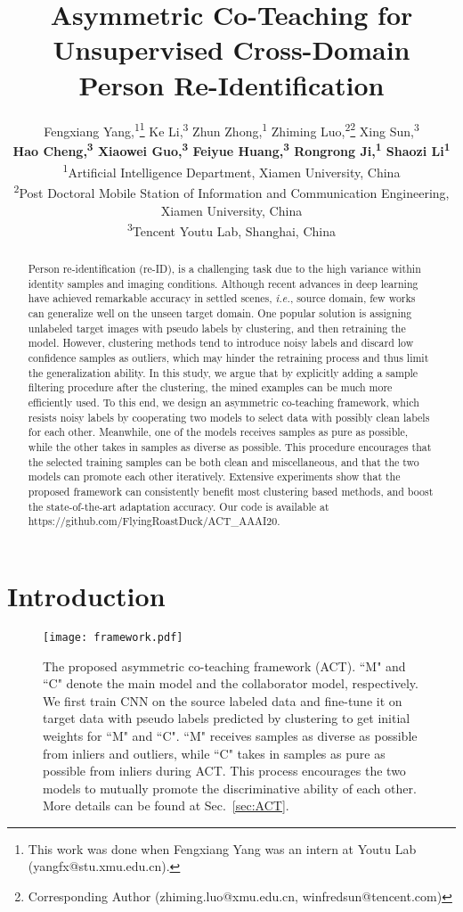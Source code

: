 \documentclass[letterpaper]{article} \usepackage{aaai20}  \usepackage{times}  \usepackage{helvet} \usepackage{courier}  \usepackage[hyphens]{url}  \usepackage{graphicx} \urlstyle{rm} \def\UrlFont{\rm}  \usepackage{graphicx}  \frenchspacing  \setlength{\pdfpagewidth}{8.5in}  \setlength{\pdfpageheight}{11in}  \usepackage{color}
\title{Asymmetric Co-Teaching for Unsupervised Cross-Domain \\ Person Re-Identification}
\author{
Fengxiang Yang,\textsuperscript{\rm 1}\thanks{This work was done when Fengxiang Yang was an intern at Youtu Lab (yangfx@stu.xmu.edu.cn).}
Ke Li,\textsuperscript{\rm 3}
Zhun Zhong,\textsuperscript{\rm 1}
Zhiming Luo,\textsuperscript{\rm 2}\thanks{Corresponding Author (zhiming.luo@xmu.edu.cn, winfredsun@tencent.com)}
Xing Sun,\textsuperscript{\rm 3}\textsuperscript{}\\
\Large \textbf{Hao Cheng,\textsuperscript{\rm 3}
Xiaowei Guo,\textsuperscript{\rm 3}
Feiyue Huang,\textsuperscript{\rm 3}
Rongrong Ji,\textsuperscript{\rm 1}
Shaozi Li\textsuperscript{\rm 1}}\\
\textsuperscript{\rm 1}Artificial Intelligence Department, Xiamen University, China\\
\textsuperscript{\rm 2}Post Doctoral Mobile Station of Information and Communication Engineering, Xiamen University, China\\
\textsuperscript{\rm 3}Tencent Youtu Lab, Shanghai, China
}
\begin{document}
\maketitle

\begin{abstract}

Person re-identification (re-ID), is a challenging task due to the high variance within identity samples and imaging conditions. Although recent advances in deep learning have achieved remarkable accuracy in settled scenes, \textit{i.e.}, source domain, few works can generalize well on the unseen target domain. One popular solution is assigning unlabeled target images with pseudo labels by clustering, and then retraining the model. However, clustering methods tend to introduce noisy labels and discard low confidence samples as outliers, which may hinder the retraining process and thus limit the generalization ability. In this study, we argue that by explicitly adding a sample filtering procedure after the clustering, the mined examples can be much more efficiently used. To this end, we design an asymmetric co-teaching framework, which resists noisy labels by cooperating two models to select data with possibly clean labels for each other. Meanwhile, one of the models receives samples as pure as possible, while the other takes in samples as diverse as possible. This procedure encourages that the selected training samples can be both clean and miscellaneous, and that the two models can promote each other iteratively. Extensive experiments show that the proposed framework can consistently benefit most clustering based methods, and boost the state-of-the-art adaptation accuracy. Our code is available at https://github.com/FlyingRoastDuck/ACT\_AAAI20.

\end{abstract}


\section{Introduction}
\label{sec:da}


\begin{figure*}[!t]
  \texttt{[image: framework.pdf]}
  \label{fig:process}
  \caption{The proposed asymmetric co-teaching framework (ACT). ``M" and ``C" denote the main model and the collaborator model, respectively. We first train CNN on the source labeled data and fine-tune it on target data with pseudo labels predicted by clustering to get initial weights for ``M" and ``C". ``M" receives samples as diverse as possible from inliers and outliers, while ``C" takes in samples as pure as possible from inliers during ACT. This process encourages the two models to mutually promote the discriminative ability of each other. More details can be found at Sec.~\ref{sec:ACT}.}
\end{figure*}
\end{document}
